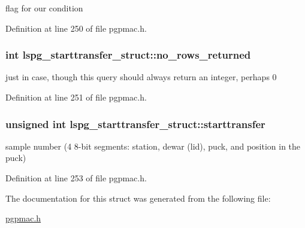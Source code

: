 flag for our condition 



Definition at line 250 of file pgpmac.\-h.

\hypertarget{structlspg__starttransfer__struct_aa384ccd326d9247317f77072b93f94ca}{
\subsubsection[{no\-\_\-rows\-\_\-returned}]{\setlength{\rightskip}{0pt plus 5cm}int lspg\-\_\-starttransfer\-\_\-struct\-::no\-\_\-rows\-\_\-returned}}\label{structlspg__starttransfer__struct_aa384ccd326d9247317f77072b93f94ca}


just in case, though this query should always return an integer, perhaps 0 



Definition at line 251 of file pgpmac.\-h.

\hypertarget{structlspg__starttransfer__struct_af01b6bac6db9830719aef63e552312eb}{
\subsubsection[{starttransfer}]{\setlength{\rightskip}{0pt plus 5cm}unsigned int lspg\-\_\-starttransfer\-\_\-struct\-::starttransfer}}\label{structlspg__starttransfer__struct_af01b6bac6db9830719aef63e552312eb}


sample number (4 8-\/bit segments\-: station, dewar (lid), puck, and position in the puck) 



Definition at line 253 of file pgpmac.\-h.



The documentation for this struct was generated from the following file\-:\begin{DoxyCompactItemize}
\item 
\hyperlink{pgpmac_8h}{pgpmac.\-h}\end{DoxyCompactItemize}
